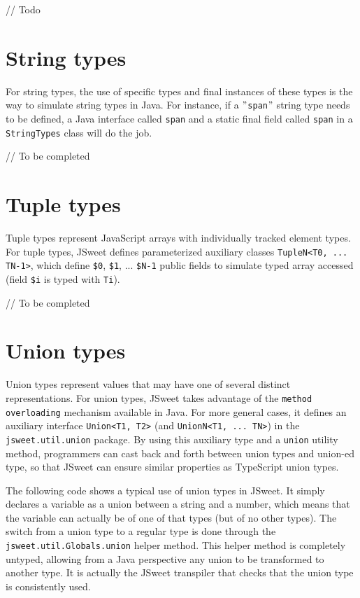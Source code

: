 \documentclass[a4paper]{report}
\begin{document}
// Todo

\section{String types}

For string types, the use of specific types and final instances of these types is the way to simulate string types in Java. For instance, if a \texttt{$"$span$"$} string type needs to be defined, a Java interface called \texttt{span} and a static final field called \texttt{span} in a \texttt{StringTypes} class will do the job. 

// To be completed

\section{Tuple types}

Tuple types represent JavaScript arrays with individually tracked element types. For tuple types, JSweet defines parameterized auxiliary classes \texttt{TupleN<T0, ... TN-1>}, which define \texttt{\$0}, \texttt{\$1}, ... \texttt{\$N-1} public fields to simulate typed array accessed (field \texttt{\$i} is typed with \texttt{Ti}).

// To be completed

\section{Union types}

Union types represent values that may have one of several distinct representations. For union types, JSweet takes advantage of the \texttt{method overloading} mechanism available in Java. For more general cases, it defines an auxiliary interface \texttt{Union<T1, T2>} (and \texttt{UnionN<T1, ... TN>}) in the \texttt{jsweet.\-util.\-union} package. By using this auxiliary type and a \texttt{union} utility method, programmers can cast back and forth between union types and union-ed type, so that JSweet can ensure similar properties as TypeScript union types. 

The following code shows a typical use of union types in JSweet. It simply declares a variable as a union between a string and a number, which means that the variable can actually be of one of that types (but of no other types). The switch from a union type to a regular type is done through the \texttt{jsweet\-.util\-.Globals\-.union} helper method. This helper method is completely untyped, allowing from a Java perspective any union to be transformed to another type. It is actually the JSweet transpiler that checks that the union type is consistently used.
\end{document}
